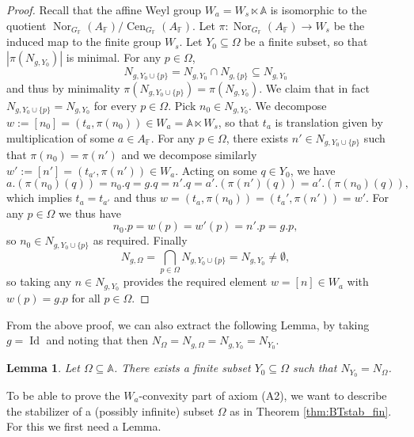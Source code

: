 \documentclass[12pt]{amsart}
\newcommand{\F}{\mathbb{F} }
\newcommand{\A}{\mathbb{A}}
\numberwithin{equation}{section}
\newtheorem{lemma}[theorem]{Lemma}
\theoremstyle{remark} %
\begin{document}
\begin{proof}
			Recall that the affine Weyl group $W_a = W_s \ltimes \A$ is isomorphic to the quotient $\operatorname{Nor}_{G_\F}(A_\F) / \operatorname{Cen}_{G_\F}(A_\F)$. Let $\pi \colon \operatorname{Nor}_{G_\F}(A_\F) \to W_s$ be the induced map to the finite group $W_s$. Let $Y_0 \subseteq \Omega$ be a finite subset, so that $|\pi(N_{g,Y_0})|$ is minimal. For any $p \in \Omega$,
			$$
			N_{g,Y_0 \cup \{p\}} = N_{g,Y_0} \cap N_{g,\{p\}} \subseteq N_{g,Y_0}
			$$
			and thus by minimality $\pi(N_{g,Y_0 \cup \{p\}}) = \pi(N_{g,Y_0})$. We claim that in fact $N_{g,Y_0 \cup \{p\}} = N_{g,Y_0}$ for every $p \in \Omega$.
			Pick $n_0\in N_{g,Y_0}$. 
			We decompose $w := [n_0] =  (t_a,\pi(n_0)) \in W_a = \A \ltimes W_s$, so that $t_a$ is translation given by multiplication of some $a\in A_\F$. For any $p \in \Omega$, there exists $n' \in N_{g,Y_0 \cup \{p\}}$ such that $\pi(n_0) = \pi(n')$ and we decompose similarly $w' := [n'] = (t_{a'},\pi(n')) \in W_a$. Acting on some $q\in Y_0$, we have
			$$
			a.(\pi(n_0)(q)) = n_0.q = g.q = n'.q = a'.(\pi(n')(q)) = a'.(\pi(n_0)(q)),
			$$
			which implies $t_a = t_{a'}$ and thus $w= (t_a,\pi(n_0)) = (t_{a}', \pi(n')) = w'$. For any $p \in \Omega$ we thus have
			$$
			n_0.p = w(p) = w'(p) =  n'.p = g.p,
			$$
			so $n_0 \in N_{g, Y_0\cup\{p\}}$ as required. Finally
			$$
			N_{g,\Omega} %
			= \bigcap_{p \in \Omega} N_{g, Y_0\cup \{p\}} = N_{g,Y_0} \neq \emptyset,
			$$
			so taking any $n \in N_{g,Y_0}$ provides the required element $w = [n] \in W_a$ with $w(p) = g.p$ for all $p \in \Omega$.
		\end{proof}
		From the above proof, we can also extract the following Lemma, by taking $g=\operatorname{Id}$ and noting that then $N_\Omega =  N_{g,\Omega} =  N_{g,Y_0} = N_{Y_0}$.
		\begin{lemma}\label{lem:BTNY0=NOmega}
			Let $\Omega \subseteq \A$. There exists a finite subset $Y_0 \subseteq \Omega$ such that $N_{Y_{0}} = N_{\Omega}$.
		\end{lemma}
		To be able to prove the $W_a$-convexity part of axiom (A2), we want to describe the stabilizer of a (possibly infinite) subset $\Omega$ as in Theorem \ref{thm:BTstab_fin}. For this we first need a Lemma.
		
\end{document}
